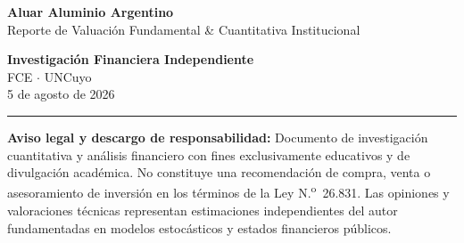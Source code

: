 \documentclass[10pt,a4paper]{article}
\begin{document}
\renewcommand{\topfraction}{0.95}
\renewcommand{\bottomfraction}{0.95}
\renewcommand{\floatpagefraction}{0.85}
\renewcommand{\textfraction}{0.05}


\noindent
\begin{minipage}[b]{0.65\textwidth}
    {\fontsize{22}{26}\selectfont \color{gsnavy} \textbf{Aluar Aluminio Argentino}} \\[0.15cm]
    {\large \color{gsgray} \textsf{Reporte de Valuación Fundamental \& Cuantitativa Institucional}}
\end{minipage}%
\begin{minipage}[b]{0.35\textwidth}
    \raggedleft
    {\small \color{gsgray} \textbf{Investigación Financiera Independiente}} \\
    {\small \color{gsgray} FCE $\cdot$ UNCuyo} \\
    {\small \color{gsgray} 5 de agosto de 2026}
\end{minipage}

\vspace{0.15cm}
\noindent\textcolor{gsnavy}{\rule{\textwidth}{1.2pt}}
\vspace{0.08cm}

\noindent
{\scriptsize \color{gsgray} \textbf{Aviso legal y descargo de responsabilidad:} Documento de investigación cuantitativa y análisis financiero con fines exclusivamente educativos y de divulgación académica. No constituye una recomendación de compra, venta o asesoramiento de inversión en los términos de la Ley N.\textsuperscript{o}~26.831. Las opiniones y valoraciones técnicas representan estimaciones independientes del autor fundamentadas en modelos estocásticos y estados financieros públicos.}

\vspace{0.15cm}
\end{document}
